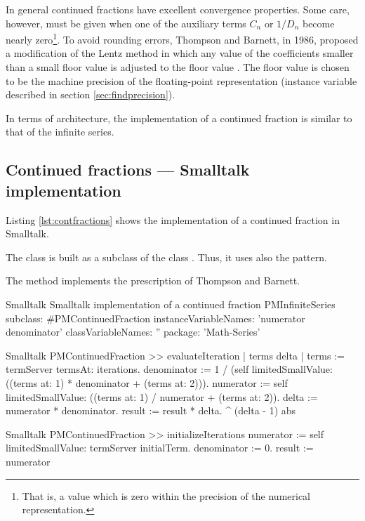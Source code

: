 In general continued fractions have excellent convergence
properties. Some care, however, must be given when one of the
auxiliary terms $C_n$ or $1/D_n$ become nearly zero\footnote{That
is, a value which is zero within the precision of the numerical
representation.}. To avoid rounding errors, Thompson and Barnett,
in 1986, proposed a modification of the Lentz method in which any
value of the coefficients smaller than a small floor value is
adjusted to the floor value \cite{Press}. The floor value is
chosen to be the machine precision of the floating-point
representation (instance variable  described in
section \ref{sec:findprecision}).

In terms of architecture, the implementation of a continued
fraction is similar to that of the infinite series.

\subsection{Continued fractions --- Smalltalk  implementation}
Listing \ref{lst:contfractions} shows the implementation of a continued fraction in Smalltalk.

The class  is built as a subclass of the class .
Thus, it uses also the  pattern.

The method  implements the prescription of Thompson and Barnett.
\begin{listing}[label=lst:contfractions]{Smalltalk}
{Smalltalk implementation of a continued fraction}
PMInfiniteSeries subclass: #PMContinuedFraction
   instanceVariableNames: 'numerator denominator'
   classVariableNames: ''
   package: 'Math-Series'
\end{listing}

\begin{displaycode}{Smalltalk}
PMContinuedFraction >> evaluateIteration
    | terms delta |
    terms := termServer termsAt: iterations.
    denominator := 1 / (self limitedSmallValue: ((terms at: 1) * denominator + (terms at: 2))).
    numerator := self limitedSmallValue: ((terms at: 1) / numerator + (terms at: 2)).
    delta := numerator * denominator.
    result := result * delta.
    ^ (delta - 1) abs
\end{displaycode}

\begin{displaycode}{Smalltalk}
PMContinuedFraction >> initializeIterations
    numerator := self limitedSmallValue: termServer initialTerm.
    denominator := 0.
    result := numerator
\end{displaycode}

